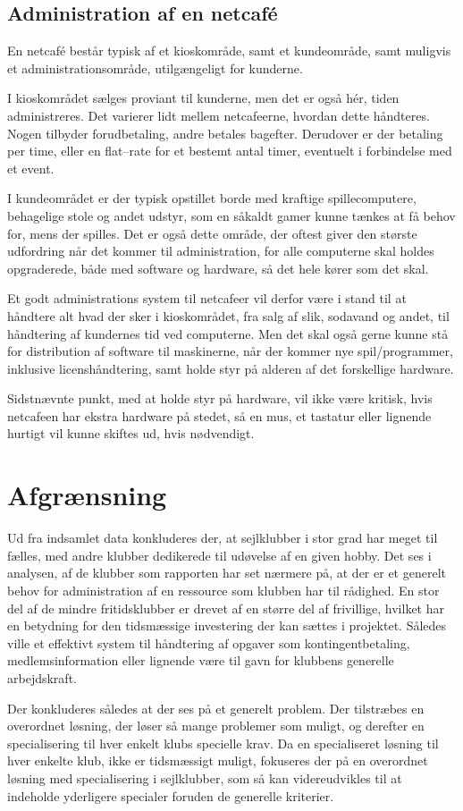 \subsection{Administration af en netcafé}\label{sec:administration-af-en-netcafe}

En netcafé består typisk af et kioskområde, samt et kundeområde, samt muligvis et administrationsområde,
utilgængeligt for kunderne.

I kioskområdet sælges proviant til kunderne, men det er også hér, tiden administreres. Det varierer lidt
mellem netcafeerne, hvordan dette håndteres. Nogen tilbyder forudbetaling, andre betales bagefter. Derudover
er der betaling per time, eller en flat--rate for et bestemt antal timer, eventuelt i forbindelse med et
event.

I kundeområdet er der typisk opstillet borde med kraftige spillecomputere, behagelige stole og andet udstyr,
som en såkaldt gamer kunne tænkes at få behov for, mens der spilles. Det er også dette område, der oftest
giver den største udfordring når det kommer til administration, for alle computerne skal holdes opgraderede,
både med software og hardware, så det hele kører som det skal.

Et godt administrations system til netcafeer vil derfor være i stand til at håndtere alt hvad der sker i
kioskområdet, fra salg af slik, sodavand og andet, til håndtering af kundernes tid ved computerne. Men det
skal også gerne kunne stå for distribution af software til maskinerne, når der kommer nye spil/programmer,
inklusive licenshåndtering, samt holde styr på alderen af det forskellige hardware.

Sidstnævnte punkt, med at holde styr på hardware, vil ikke være kritisk, hvis netcafeen har ekstra hardware på
stedet, så en mus, et tastatur eller lignende hurtigt vil kunne skiftes ud, hvis nødvendigt.


\section{Afgrænsning}

Ud fra indsamlet data konkluderes der, at sejlklubber i stor grad har meget til fælles, med andre klubber dedikerede til udøvelse af en given hobby. Det ses i analysen, af de klubber som rapporten har set nærmere på, at der er et generelt behov for administration af en ressource som klubben har til rådighed. En stor del af de mindre fritidsklubber er drevet af en større del af frivillige, hvilket har en betydning for den tidsmæssige investering der kan sættes i projektet. Således ville et effektivt system til håndtering af opgaver som kontingentbetaling, medlemsinformation eller lignende være til gavn for klubbens generelle arbejdskraft.

Der konkluderes således at der ses på et generelt problem. Der tilstræbes en overordnet løsning, der løser så mange problemer som muligt, og derefter en specialisering til hver enkelt klubs specielle krav. Da en specialiseret løsning til hver enkelte klub, ikke er tidsmæssigt muligt, fokuseres der på en overordnet løsning med specialisering i sejlklubber, som så kan videreudvikles til at indeholde yderligere specialer foruden de generelle kriterier.


\cbend

